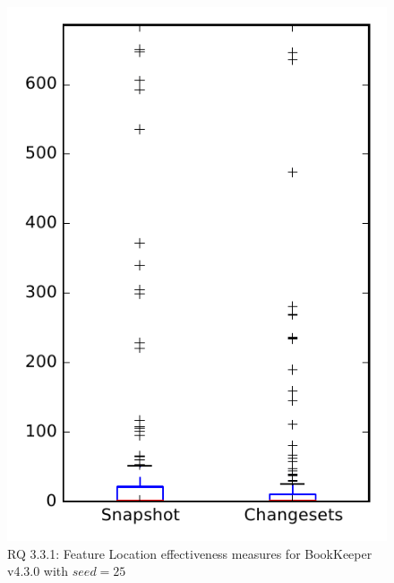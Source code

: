 
\begin{figure}
\centering
\includegraphics[height=0.4\textheight]{figures/flt_seed/rq1_bookkeeper_25}
\caption{RQ 3.3.1: Feature Location effectiveness measures for BookKeeper v4.3.0 with $seed=25$}
\label{fig:flt_seed:rq1:bookkeeper}
\end{figure}

